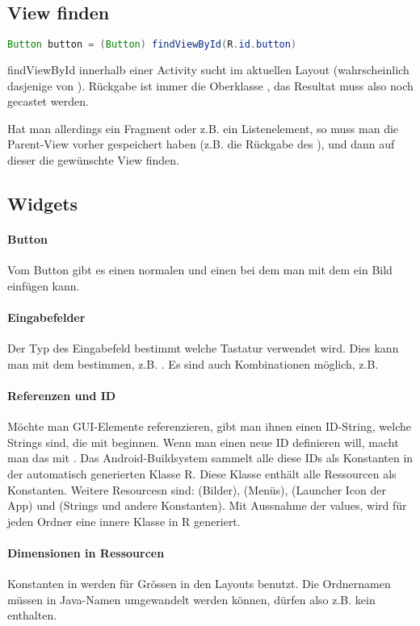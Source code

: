 \subsection{View finden}
\begin{lstlisting}[language=java]
Button button = (Button) findViewById(R.id.button)
\end{lstlisting}
findViewById innerhalb einer Activity sucht im aktuellen Layout (wahrscheinlich dasjenige von ). Rückgabe ist immer die Oberklasse ,  das Resultat muss also noch gecastet werden.

Hat man allerdings ein Fragment oder z.B. ein Listenelement, so muss man die Parent-View vorher gespeichert haben (z.B. die Rückgabe des ), und dann auf dieser die gewünschte View finden. 

\subsection{Widgets}
\paragraph{Button} Vom Button gibt es einen normalen  und einen  bei dem man mit dem  ein Bild einfügen kann.
\paragraph{Eingabefelder} Der Typ des Eingabefeld bestimmt welche Tastatur verwendet wird. Dies kann man mit dem  bestimmen, z.B. . Es sind auch Kombinationen möglich, z.B. 
\paragraph{Referenzen und ID} Möchte man GUI-Elemente referenzieren, gibt man ihnen einen ID-String, welche Strings sind, die mit  beginnen. Wenn man einen neue ID definieren will, macht man das mit . Das Android-Buildsystem sammelt alle diese IDs als Konstanten in der automatisch generierten Klasse R. Diese Klasse enthält alle Ressourcen als Konstanten. Weitere Resourcesn sind:  (Bilder),  (Menüs),  (Launcher Icon der App) und  (Strings und andere Konstanten). Mit Aussnahme der values, wird für jeden Ordner eine innere Klasse in R generiert.
\paragraph{Dimensionen in Ressourcen} Konstanten in  werden für Grössen in den Layouts benutzt.
Die Ordnernamen müssen in Java-Namen umgewandelt werden können, dürfen also z.B. kein \code{-} enthalten.

